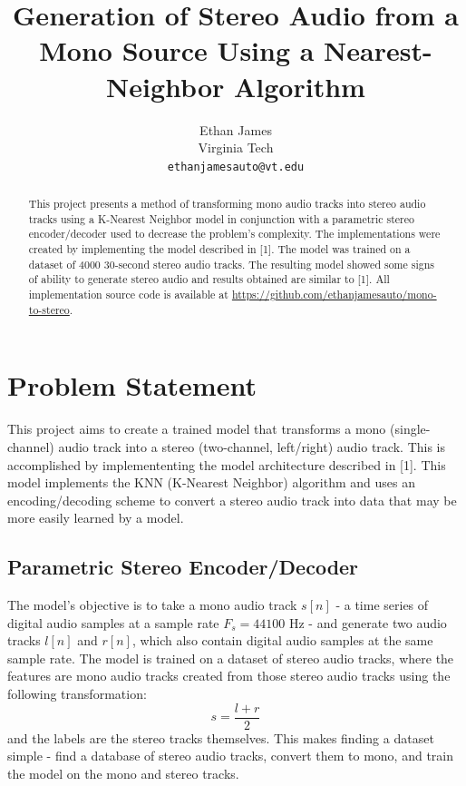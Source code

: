 \documentclass{article}
\title{Generation of Stereo Audio from a Mono Source Using
a Nearest-Neighbor Algorithm}
\author{%
  Ethan James \\
  Virginia Tech\\
  \texttt{ethanjamesauto@vt.edu} \\
}
\begin{document}
\maketitle

\begin{abstract}
  This project presents a method of transforming mono audio tracks into stereo audio tracks using a K-Nearest Neighbor model in conjunction with a parametric stereo encoder/decoder used to decrease the problem's complexity. The implementations were created by implementing the model described in [1]. The model was trained on a dataset of 4000 30-second stereo audio tracks. The resulting model showed some signs of ability to generate stereo audio and results obtained are similar to [1]. All implementation source code is available at \url{https://github.com/ethanjamesauto/mono-to-stereo}.
\end{abstract}

\section{Problem Statement}
This project aims to create a trained model that transforms a mono (single-channel) audio track into a stereo (two-channel, left/right) audio track. This is accomplished by implemententing the model architecture described in [1]. This model implements the KNN (K-Nearest Neighbor) algorithm and uses an encoding/decoding scheme to convert a stereo audio track into data that may be more easily learned by a model.


\subsection{Parametric Stereo Encoder/Decoder}

The model's objective is to take a mono audio track $s[n]$ - a time series of digital audio samples at a sample rate $F_s=44100$ Hz - and generate two audio tracks $l[n]$ and $r[n]$, which also contain digital audio samples at the same sample rate. The model is trained on a dataset of stereo audio tracks, where the features are mono audio tracks created from those stereo audio tracks using the following transformation:
$$s = \frac{l+r}{2}$$
and the labels are the stereo tracks themselves. This makes finding a dataset simple - find a database of stereo audio tracks, convert them to mono, and train the model on the mono and stereo tracks.
\end{document}
